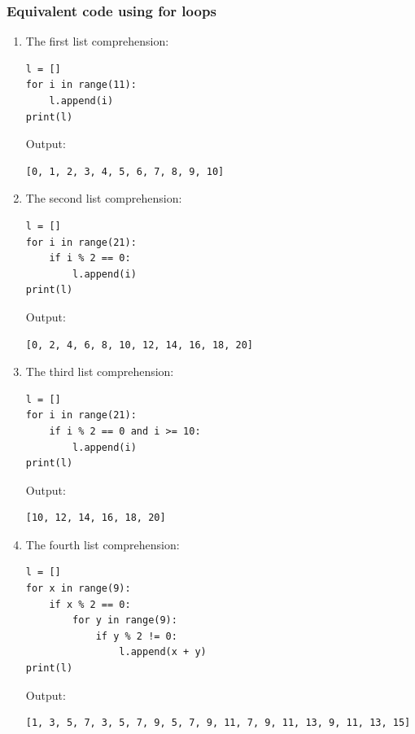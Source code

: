 \documentclass[11pt]{article}
\begin{document}
\subsubsection{Equivalent code using for loops}
\label{sec:orgad97fcb}
\begin{enumerate}
\item The first list comprehension:
\begin{verbatim}
l = []
for i in range(11):
    l.append(i)
print(l)
\end{verbatim}

 \noindent Output:

\begin{verbatim}
[0, 1, 2, 3, 4, 5, 6, 7, 8, 9, 10]
\end{verbatim}

\item The second list comprehension:
\begin{verbatim}
l = []
for i in range(21):
    if i % 2 == 0:
        l.append(i)
print(l)
\end{verbatim}

 \noindent Output:

\begin{verbatim}
[0, 2, 4, 6, 8, 10, 12, 14, 16, 18, 20]
\end{verbatim}

\item The third list comprehension:
\begin{verbatim}
l = []
for i in range(21):
    if i % 2 == 0 and i >= 10:
        l.append(i)
print(l)
\end{verbatim}

 \noindent Output:

\begin{verbatim}
[10, 12, 14, 16, 18, 20]
\end{verbatim}


 \newpage

\item The fourth list comprehension:
\begin{verbatim}
l = []
for x in range(9):
    if x % 2 == 0:
        for y in range(9):
            if y % 2 != 0:
                l.append(x + y)
print(l)
\end{verbatim}

 \noindent Output:

\begin{verbatim}
[1, 3, 5, 7, 3, 5, 7, 9, 5, 7, 9, 11, 7, 9, 11, 13, 9, 11, 13, 15]
\end{verbatim}
\end{enumerate}
\end{document}
